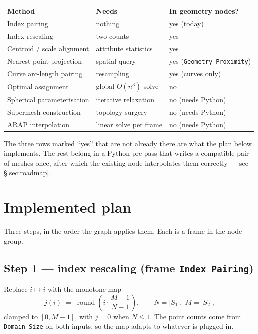 \documentclass[11pt,a4paper]{article}
\newcommand{\src}{S_1}
\newcommand{\dst}{S_2}
\newcommand{\node}[1]{\texttt{#1}}
\begin{document}
\begin{center}
\begin{tabular}{@{}lll@{}}
\toprule
\textbf{Method} & \textbf{Needs} & \textbf{In geometry nodes?} \\
\midrule
Index pairing               & nothing                    & yes (today) \\
Index rescaling             & two counts                 & yes \\
Centroid / scale alignment  & attribute statistics       & yes \\
Nearest-point projection    & spatial query              & yes (\node{Geometry Proximity}) \\
Curve arc-length pairing    & resampling                 & yes (curves only) \\
Optimal assignment          & global $O(n^3)$ solve      & no \\
Spherical parameterisation  & iterative relaxation       & no (needs Python) \\
Supermesh construction      & topology surgery           & no (needs Python) \\
ARAP interpolation          & linear solve per frame     & no (needs Python) \\
\bottomrule
\end{tabular}
\end{center}

The three rows marked ``yes'' that are not already there are what the plan
below implements. The rest belong in a Python pre-pass that writes a
compatible pair of meshes once, after which the existing node interpolates
them correctly --- see \S\ref{sec:roadmap}.

\section{Implemented plan}

Three steps, in the order the graph applies them. Each is a frame in the
node group.

\subsection*{Step 1 --- index rescaling (frame \node{Index Pairing})}

Replace $i \mapsto i$ with the monotone map
\begin{equation}
  j(i) \;=\;
  \operatorname{round}\!\left( i \cdot \frac{M-1}{\,N-1\,} \right),
  \qquad N=|\src|,\; M=|\dst| ,
  \label{eq:rescale}
\end{equation}
clamped to $[0, M-1]$, with $j=0$ when $N \le 1$. The point counts come from
\node{Domain Size} on both inputs, so the map adapts to whatever is plugged
in.
\end{document}
